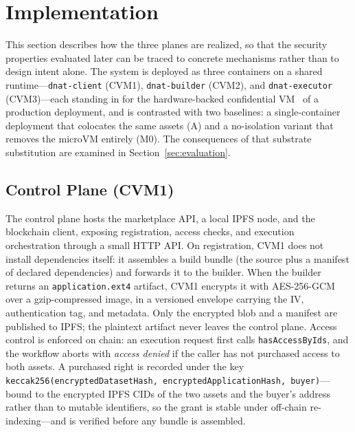 
\section{Implementation}
\label{sec:implementation}

This section describes how the three planes are realized, so that the security properties
evaluated later can be traced to concrete mechanisms rather than to design intent alone. The
system is deployed as three containers on a shared runtime---\texttt{dnat-client} (CVM1),
\texttt{dnat-builder} (CVM2), and \texttt{dnat-executor} (CVM3)---each standing in for the
hardware-backed confidential VM~\cite{amd2020sevsnp} of a production deployment, and is
contrasted with two baselines: a single-container deployment that colocates the same assets
(A) and a no-isolation variant that removes the microVM entirely (M0). The consequences of
that substrate substitution are examined in Section~\ref{sec:evaluation}.

\subsection{Control Plane (CVM1)}

The control plane hosts the marketplace API, a local IPFS node, and the blockchain client,
exposing registration, access checks, and execution orchestration through a small HTTP API.
On registration, CVM1 does not install dependencies itself: it assembles a build bundle (the
source plus a manifest of declared dependencies) and forwards it to the builder. When the
builder returns an \texttt{application.ext4} artifact, CVM1 encrypts it with AES-256-GCM
over a gzip-compressed image, in a versioned envelope carrying the IV, authentication tag,
and metadata. Only the encrypted blob and a manifest are published to IPFS; the plaintext
artifact never leaves the control plane. Access control is enforced on chain: an execution
request first calls \texttt{hasAccessByIds}, and the workflow aborts with \emph{access
denied} if the caller has not purchased access to both assets. A purchased right is recorded
under the key \texttt{keccak256(encryptedDatasetHash, encryptedApplicationHash,
buyer)}---bound to the encrypted IPFS CIDs of the two assets and the buyer's address rather
than to mutable identifiers, so the grant is stable under off-chain re-indexing---and is
verified before any bundle is assembled.

